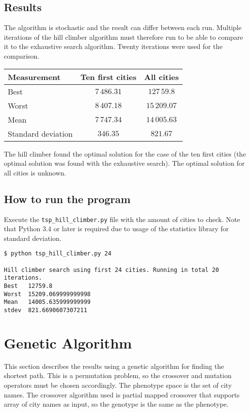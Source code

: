 \documentclass{article}
\begin{document}
\subsection*{Results}

The algorithm is stochastic and the result can differ between each run. Multiple iterations of the hill climber algorithm must therefore run to be able to compare it to the exhaustive search algorithm. Twenty iterations were used for the comparison.

\begin{center}
\begin{tabular}{lcc}
\toprule
Measurement & Ten first cities & All cities \\
\midrule
Best & $7\,486.31$ & $127\,59.8$ \\
Worst & $8\,407.18$ & $15\,209.07$ \\
Mean & $7\,747.34$ & $14\,005.63$ \\
Standard deviation & $346.35$ & $821.67$ \\
\bottomrule
\end{tabular}
\end{center}

The hill climber found the optimal solution for the case of the ten first cities (the optimal solution was found with the exhaustive search). The optimal solution for all cities is unknown.

\subsection*{How to run the program}

Execute the \texttt{tsp\_hill\_climber.py} file with the amount of cities to check. Note that Python 3.4 or later is required due to usage of the statistics library for standard deviation.

\begin{verbatim}
$ python tsp_hill_climber.py 24

Hill climber search using first 24 cities. Running in total 20
iterations.
Best   12759.8
Worst  15209.069999999998
Mean   14005.635999999999
stdev  821.6690607307211
\end{verbatim}


\section*{Genetic Algorithm}

This section describes the results using a genetic algorithm for finding the shortest path. This is a permutation problem, so the crossover and mutation operators must be chosen accordingly. The phenotype space is the set of city names. The crossover algorithm used is partial mapped crossover that supports array of city names as input, so the genotype is the same as the phenotype.
\end{document}
